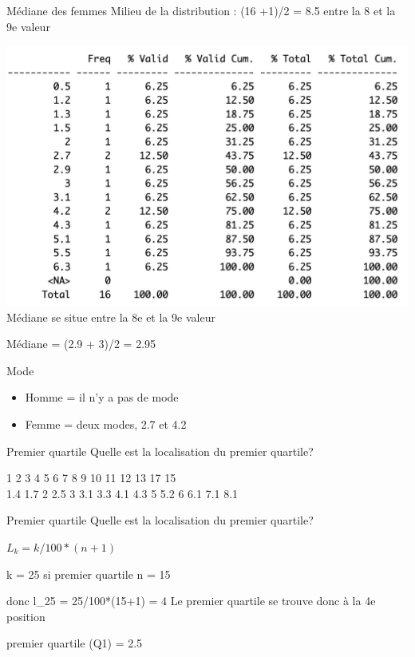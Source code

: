 \documentclass[
  ignorenonframetext,
]{beamer}
\providecommand{\tightlist}{%
  \setlength{\itemsep}{0pt}\setlength{\parskip}{0pt}}
\begin{document}
\begin{frame}{Médiane des femmes}
\protect\hypertarget{muxe9diane-des-femmes}{}
Milieu de la distribution : (16 +1)/2 = 8.5 entre la 8 et la 9e valeur

\includegraphics{../../Images/cours4.2.jpg} Médiane se situe entre la 8e
et la 9e valeur

Médiane = (2.9 + 3)/2 = 2.95
\end{frame}

\begin{frame}{Mode}
\protect\hypertarget{mode}{}
\begin{itemize}
\tightlist
\item
  Homme = il n'y a pas de mode
\item
  Femme = deux modes, 2.7 et 4.2
\end{itemize}
\end{frame}

\begin{frame}{Premier quartile}
\protect\hypertarget{premier-quartile}{}
Quelle est la localisation du premier quartile?

1 2 3 4 5 6 7 8 9 10 11 12 13 17 15\\
1.4 1.7 2 2.5 3 3.1 3.3 4.1 4.3 5 5.2 6 6.1 7.1 8.1
\end{frame}

\begin{frame}{Premier quartile}
\protect\hypertarget{premier-quartile-1}{}
Quelle est la localisation du premier quartile?

\(L_k = k/100*(n + 1)\)

k = 25 si premier quartile n = 15

donc l\_25 = 25/100*(15+1) = 4 Le premier quartile se trouve donc à la
4e position

premier quartile (Q1) = 2.5
\end{frame}
\end{document}
